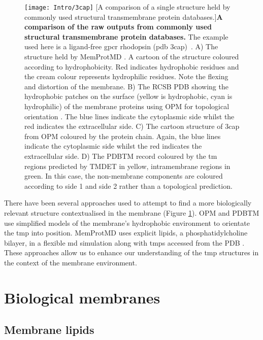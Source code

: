 \begin{figure}[ht!]
\centering
\texttt{[image: Intro/3cap]}
		[A comparison of a single structure held by commonly used structural transmembrane protein databases.]{\textbf{A comparison of the raw outputs from commonly used structural transmembrane protein databases.}
		The example used here is a ligand\--free \gls{gpcr} rhodopsin (\gls{pdb} 3cap)~\cite{Park2008}.
		A) The structure held by MemProtMD \cite{Stansfeld2015}. A cartoon of the structure coloured according to hydrophobicity. Red indicates hydrophobic residues and the cream colour represents hydrophilic residues. Note the flexing and distortion of the membrane.
		B) The RCSB PDB \cite{Berman2000} showing the hydrophobic patches on the surface (yellow is hydrophobic, cyan is hydrophilic) of the membrane proteins using OPM for topological orientation \cite{Lomize2012}.
		The blue lines indicate the cytoplasmic side whilst the red indicates the extracellular side.
		C) The cartoon structure of 3cap from OPM \cite{Lomize2012} coloured by the protein chain.
		Again, the blue lines indicate the cytoplasmic side whilst the red indicates the extracellular side.
		D) The PDBTM \cite{Kozma2012} record coloured by the \gls{tm} regions predicted by TMDET \cite{Tusnady2005} in yellow, intramembrane regions in green.
		In this case, the non\--membrane components are coloured according to side 1 and side 2 rather than a topological prediction.
		}

\label{fig:3cap}
\end{figure}

There have been several approaches used to attempt to find a more biologically relevant structure contextualised in the membrane (Figure \ref{fig:3cap}).
OPM \cite{Lomize2012} and PDBTM \cite{Kozma2012} use simplified models of the membrane's hydrophobic environment to orientate the \gls{tmp} into position.
MemProtMD \cite{Stansfeld2015} uses explicit lipids, a phosphatidylcholine bilayer, in a flexible \gls{md} simulation  along with \gls{tmp}s accessed from the PDB \cite{Berman2000}.
These approaches allow us to enhance our understanding of the \gls{tmp} structures in the context of the membrane environment.

\section{Biological membranes}
\subsection{Membrane lipids}

